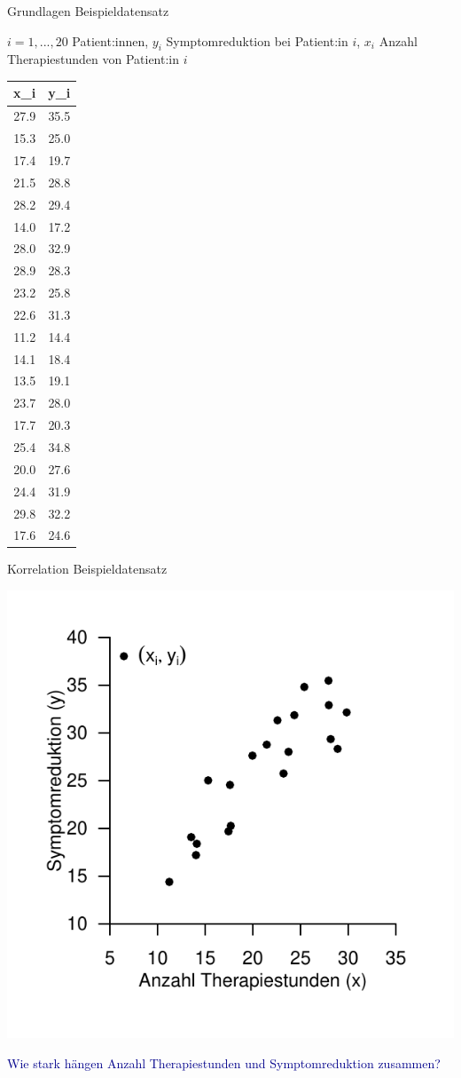 \documentclass[
  8pt,
  ignorenonframetext,
]{beamer}
\begin{document}
\begin{frame}{Grundlagen}
\protect\hypertarget{grundlagen}{}
Beispieldatensatz

\center
\footnotesize

\(i = 1,...,20\) Patient:innen, \(y_i\) Symptomreduktion bei Patient:in
\(i\), \(x_i\) Anzahl Therapiestunden von Patient:in \(i\)



\begin{longtable}[]{@{}rr@{}}
\toprule()
x\_i & y\_i \\
\midrule()
\endhead
27.9 & 35.5 \\
15.3 & 25.0 \\
17.4 & 19.7 \\
21.5 & 28.8 \\
28.2 & 29.4 \\
14.0 & 17.2 \\
28.0 & 32.9 \\
28.9 & 28.3 \\
23.2 & 25.8 \\
22.6 & 31.3 \\
11.2 & 14.4 \\
14.1 & 18.4 \\
13.5 & 19.1 \\
23.7 & 28.0 \\
17.7 & 20.3 \\
25.4 & 34.8 \\
20.0 & 27.6 \\
24.4 & 31.9 \\
29.8 & 32.2 \\
17.6 & 24.6 \\
\bottomrule()
\end{longtable}
\end{frame}

\begin{frame}{Korrelation}
\protect\hypertarget{korrelation-1}{}
Beispieldatensatz

\begin{center}\includegraphics[width=0.55\linewidth]{7_Abbildungen/mvda_7_beispieldatensatz_korrelation} \end{center}

\center

\textcolor{darkblue}{Wie stark hängen Anzahl Therapiestunden und Symptomreduktion zusammen?}
\end{frame}
\end{document}
